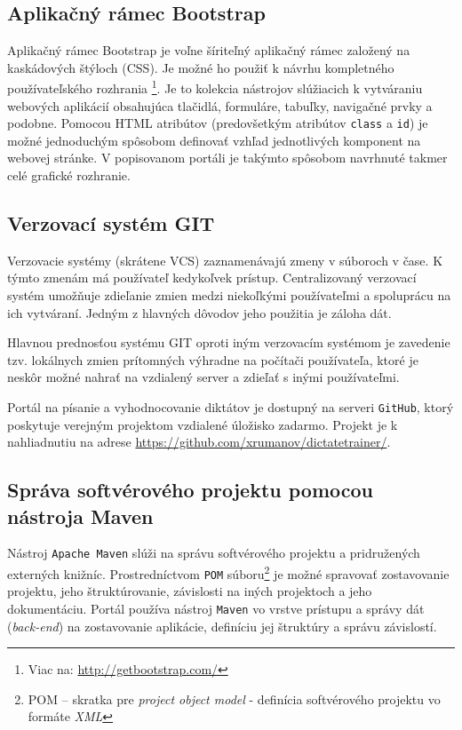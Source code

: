 \documentclass[12pt,oneside]{fithesis2}
\begin{document}
		\subsection{Aplikačný rámec Bootstrap}
			\par Aplikačný rámec Bootstrap je voľne šíriteľný aplikačný rámec založený na kaskádových štýloch (CSS). Je možné ho použiť k návrhu kompletného používateľského rozhrania \footnote{Viac na: \url{http://getbootstrap.com/}}. Je to kolekcia nástrojov slúžiacich k vytváraniu webových aplikácií \cite{w3c-bootstrap} obsahujúca tlačidlá, formuláre, tabuľky, navigačné prvky a podobne. Pomocou HTML atribútov (predovšetkým atribútov \texttt{class} a \texttt{id}) je možné jednoduchým spôsobom definovať vzhľad jednotlivých komponent na webovej stránke. V popisovanom portáli je takýmto spôsobom navrhnuté takmer celé grafické rozhranie.
			
		\subsection{Verzovací systém GIT}
		\par Verzovacie systémy (skrátene VCS) zaznamenávajú zmeny v súboroch v čase. K týmto zmenám má používateľ kedykoľvek prístup. Centralizovaný verzovací systém umožňuje zdieľanie zmien medzi niekoľkými používateľmi a spoluprácu na ich vytváraní. Jedným z hlavných dôvodov jeho použitia je záloha dát\cite{gitbook09}. 
		\par Hlavnou prednosťou systému GIT oproti iným verzovacím systémom je zavedenie tzv. lokálnych zmien prítomných výhradne na počítači používateľa, ktoré je neskôr možné nahrať na vzdialený server a zdieľať s inými používateľmi. 
		\par Portál na písanie a vyhodnocovanie diktátov je dostupný na serveri \texttt{GitHub}, ktorý poskytuje verejným projektom vzdialené úložisko zadarmo. Projekt je k nahliadnutiu na adrese \url{https://github.com/xrumanov/dictatetrainer/}.
		
		\subsection{Správa softvérového projektu pomocou nástroja Maven}
		\par Nástroj \texttt{Apache Maven} slúži na správu softvérového projektu a pridružených externých knižníc. Prostredníctvom \texttt{POM} súboru\footnote{POM -- skratka pre \textit{project object model} - definícia softvérového projektu vo formáte \textit{XML}} je možné spravovať zostavovanie projektu, jeho štruktúrovanie, závislosti na iných projektoch a jeho dokumentáciu.
		Portál používa nástroj \texttt{Maven} vo vrstve prístupu a správy dát (\textit{back-end}) na zostavovanie aplikácie, definíciu jej štruktúry a správu závislostí.
		
\end{document}
